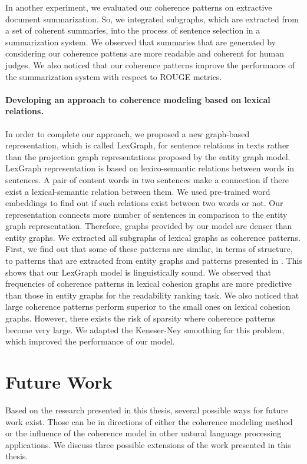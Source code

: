 In another experiment, we evaluated our coherence patterns on extractive document summarization. 
So, we integrated subgraphs, which are extracted from a set of coherent summaries, into the process of sentence selection in a summarization system. 
We observed that summaries that are generated by considering our coherence pattens are more readable and coherent for human judges. 
We also noticed that our coherence patterns improve the performance of the summarization system with respect to ROUGE metrics. 

\paragraph{Developing an approach to coherence modeling based on lexical relations.} 
In order to complete our approach, we proposed a new graph-based representation, which is called LexGraph, for sentence relations in texts rather than the projection graph representations proposed by the entity graph model.   
LexGraph representation is based on lexico-semantic relations between words in sentences.
A pair of content words in two sentences make a connection if there exist a lexical-semantic relation between them. 
We used pre-trained word embeddings to find out if such relations exist between two words or not.  
Our representation connects more number of sentences in comparison to the entity graph representation. 
Therefore, graphs provided by our model are denser than entity graphs. 
We extracted all subgraphs of lexical graphs as coherence patterns. 
First, we find out that some of these patterns are similar, in terms of structure, to patterns that are extracted from entity graphs and patterns presented in .
This shows that our LexGraph model is linguistically sound. 
We observed that frequencies of coherence patterns in lexical cohesion graphs are more predictive than those in entity graphs for the readability ranking task. 
We also noticed that large coherence patterns perform superior to the small ones on lexical cohesion graphs.  
However, there exists the risk of sparsity where coherence patterns become very large. 
We adapted the Keneser-Ney smoothing for this problem, which improved the performance of our model. 

\section{Future Work}
\label{sec:conc-future_work}

Based on the research presented in this thesis, several possible ways for future work exist. 
Those can be in directions of either the coherence modeling method or the influence of the coherence model in other natural language processing applications.   
We discuss three possible extensions of the work presented in this thesis. 


